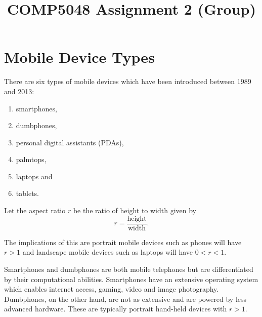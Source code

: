 \documentclass[conference]{IEEEtran}
\begin{document}
\title{COMP5048 Assignment 2 (Group)}

\author{
\and
{}
\and
{}
\and
{}
\and
{}
}

\maketitle

\begin{abstract}
\end{abstract}


\section{Mobile Device Types}

There are six types of mobile devices which have been introduced between 1989
and 2013:
\begin{enumerate}
	\item smartphones,
	\item dumbphones,
	\item personal digital assistants (PDAs),
	\item palmtops,
	\item laptops and
	\item tablets.
\end{enumerate}

Let the aspect ratio $r$ be the ratio of height to width given by
\[ r = \frac{\text{height}}{\text{width}}. \]

The implications of this are portrait mobile devices such as phones will
have $r>1$ and landscape mobile devices such as laptops will have $0<r<1$.

Smartphones and dumbphones are both mobile telephones but are differentiated by
their computational abilities. Smartphones have an extensive operating system
which enables internet access, gaming, video and image photography. Dumbphones,
on the other hand, are not as extensive and are powered by less advanced
hardware. These are typically portrait hand-held devices with $r>1$.
\end{document}
